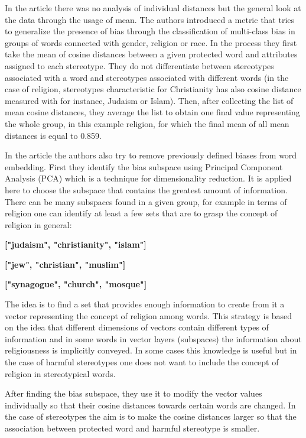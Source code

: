 \documentclass[
  12pt,
]{book}
\begin{document}
\pagebreak

In the article there was no analysis of individual distances but the general look at the data through the usage of mean. The authors introduced a metric that tries to generalize the presence of bias through the classification of multi-class bias in groups of words connected with gender, religion or race. In the process they first take the mean of cosine distances between a given protected word and attributes assigned to each stereotype. They do not differentiate between stereotypes associated with a word and stereotypes associated with different words (in the case of religion, stereotypes characteristic for Christianity has also cosine distance measured with for instance, Judaism or Islam). Then, after collecting the list of mean cosine distances, they average the list to obtain one final value representing the whole group, in this example religion, for which the final mean of all mean distances is equal to 0.859.

In the article the authors also try to remove previously defined biases from word embedding. First they identify the bias subspace using Principal Component Analysis (PCA) which is a technique for dimensionality reduction. It is applied here to choose the subspace that contains the greatest amount of information. There can be many subspaces found in a given group, for example in terms of religion one can identify at least a few sets that are to grasp the concept of religion in general:

\textbf{["judaism", "christianity", "islam"]}

\textbf{["jew", "christian", "muslim"]}

\textbf{["synagogue", "church", "mosque"]}

The idea is to find a set that provides enough information to create from it a vector representing the concept of religion among words. This strategy is based on the idea that different dimensions of vectors contain different types of information and in some words in vector layers (subspaces) the information about religiousness is implicitly conveyed. In some cases this knowledge is useful but in the case of harmful stereotypes one does not want to include the concept of religion in stereotypical words.

After finding the bias subspace, they use it to modify the vector values individually so that their cosine distances towards certain words are changed. In the case of stereotypes the aim is to make the cosine distances larger so that the association between protected word and harmful stereotype is smaller.
\end{document}
